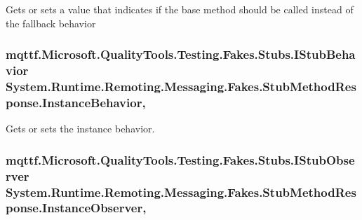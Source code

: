 Gets or sets a value that indicates if the base method should be called instead of the fallback behavior

\hypertarget{class_system_1_1_runtime_1_1_remoting_1_1_messaging_1_1_fakes_1_1_stub_method_response_a487246c8e961331f02e38173ccf7b59a}{
\subsubsection[{Instance\-Behavior}]{\setlength{\rightskip}{0pt plus 5cm}mqttf.\-Microsoft.\-Quality\-Tools.\-Testing.\-Fakes.\-Stubs.\-I\-Stub\-Behavior System.\-Runtime.\-Remoting.\-Messaging.\-Fakes.\-Stub\-Method\-Response.\-Instance\-Behavior\hspace{0.3cm}{\ttfamily [get]}, {\ttfamily [set]}}}\label{class_system_1_1_runtime_1_1_remoting_1_1_messaging_1_1_fakes_1_1_stub_method_response_a487246c8e961331f02e38173ccf7b59a}


Gets or sets the instance behavior.

\hypertarget{class_system_1_1_runtime_1_1_remoting_1_1_messaging_1_1_fakes_1_1_stub_method_response_a16d56ae2e537e7a4a0eb547a4a210aac}{
\subsubsection[{Instance\-Observer}]{\setlength{\rightskip}{0pt plus 5cm}mqttf.\-Microsoft.\-Quality\-Tools.\-Testing.\-Fakes.\-Stubs.\-I\-Stub\-Observer System.\-Runtime.\-Remoting.\-Messaging.\-Fakes.\-Stub\-Method\-Response.\-Instance\-Observer\hspace{0.3cm}{\ttfamily [get]}, {\ttfamily [set]}}}\label{class_system_1_1_runtime_1_1_remoting_1_1_messaging_1_1_fakes_1_1_stub_method_response_a16d56ae2e537e7a4a0eb547a4a210aac}


